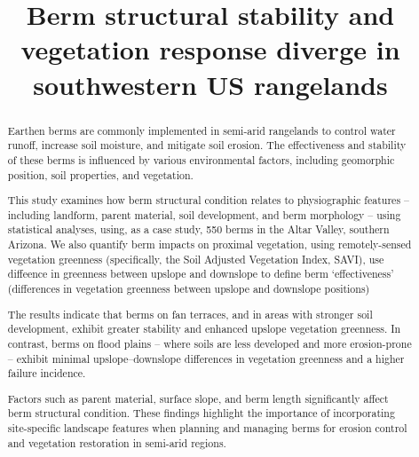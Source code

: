 \documentclass[review]{elsarticle}
\begin{document}
\begin{frontmatter}

\title{ Berm structural stability and vegetation response diverge in southwestern US rangelands}






\linenumbers

\begin{abstract} 
Earthen berms are commonly implemented in semi-arid rangelands to control water runoff, increase soil moisture, and mitigate soil erosion. The effectiveness and stability of these berms is influenced by various environmental factors, including geomorphic position, soil properties, and vegetation. 


This study examines how berm structural condition relates to physiographic features -- including landform, parent material, soil development, and berm morphology -- using statistical analyses, using, as a case study, 550 berms in the Altar Valley, southern Arizona.
We also quantify berm impacts on proximal vegetation, using remotely-sensed vegetation greenness (specifically, the Soil Adjusted Vegetation Index, SAVI), 
use diffeence in greenness between upslope and downslope to define berm `effectiveness' (differences in vegetation greenness between upslope and downslope positions)

The results indicate that berms on fan terraces, and in areas with stronger soil development, exhibit greater stability and enhanced upslope vegetation greenness.
In contrast, berms on flood plains -- where soils are less developed and more erosion-prone -- exhibit minimal upslope–downslope differences in vegetation greenness and a higher failure incidence.


Factors such as parent material, surface slope, and berm length significantly affect berm structural condition.
These findings highlight the importance of incorporating site-specific landscape features when planning and managing berms for erosion control and vegetation restoration in semi-arid regions.
\end{abstract}


\end{frontmatter}
\end{document}
